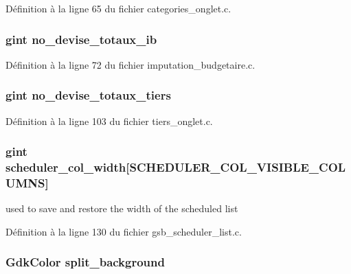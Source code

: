 Définition à la ligne 65 du fichier categories\_\-onglet.c.

\subsubsection[{no\_\-devise\_\-totaux\_\-ib}]{\setlength{\rightskip}{0pt plus 5cm}gint {\bf no\_\-devise\_\-totaux\_\-ib}}\label{gsb__file__save_8c_a2f4b5073521c582e1bc8941533026556}


Définition à la ligne 72 du fichier imputation\_\-budgetaire.c.

\subsubsection[{no\_\-devise\_\-totaux\_\-tiers}]{\setlength{\rightskip}{0pt plus 5cm}gint {\bf no\_\-devise\_\-totaux\_\-tiers}}\label{gsb__file__save_8c_a3add720d0e0b25caa37589bcfb879c6f}


Définition à la ligne 103 du fichier tiers\_\-onglet.c.

\subsubsection[{scheduler\_\-col\_\-width}]{\setlength{\rightskip}{0pt plus 5cm}gint {\bf scheduler\_\-col\_\-width}[SCHEDULER\_\-COL\_\-VISIBLE\_\-COLUMNS]}\label{gsb__file__save_8c_a8278ca506ea616623cd8cdc764188ee9}
used to save and restore the width of the scheduled list 

Définition à la ligne 130 du fichier gsb\_\-scheduler\_\-list.c.

\subsubsection[{split\_\-background}]{\setlength{\rightskip}{0pt plus 5cm}GdkColor {\bf split\_\-background}}\label{gsb__file__save_8c_abc4f631d953e2be68189a6fbcf55cd1d}


